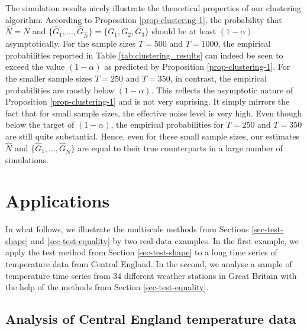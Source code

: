 The simulation results nicely illustrate the theoretical properties of our clustering algorithm. According to Proposition \ref{prop-clustering-1}, the probability that $\widehat{N} = N$ and $\{ \widehat{G}_1,\ldots,\widehat{G}_{\widehat{N}}\} = \{G_1,G_2,G_3\}$ should be at least $(1-\alpha)$ asymptotically. For the sample sizes $T = 500$ and $T = 1000$, the empirical probabilities reported in Table \ref{tab:clustering_results} can indeed be seen to exceed the value $(1-\alpha)$ as predicted by Proposition \ref{prop-clustering-1}. For the smaller sample sizes $T=250$ and $T=350$, in contrast, the empirical probabilities are mostly below $(1-\alpha)$. This reflects the asymptotic nature of Proposition \ref{prop-clustering-1} and is not very suprising. It simply mirrors the fact that for small sample sizes, the effective noise level is very high. Even though below the target of $(1-\alpha)$, the empirical probabilities for $T=250$ and $T=350$ are still quite substantial. Hence, even for these small sample sizes, our estimates $\widehat{N}$ and $\{ \widehat{G}_1,\ldots,\widehat{G}_{\widehat{N}} \}$ are equal to their true counterparts in a large number of simulations. 



\section{Applications}\label{sec-data}


In what follows, we illustrate the multiscale methods from Sections \ref{sec-test-shape} and \ref{sec-test-equality} by two real-data examples. In the first example, we apply the test method from Section \ref{sec-test-shape} to a long time series of temperature data from Central England. In the second, we analyse a sample of temperature time series from 34 different weather stations in Great Britain with the help of the methods from Section \ref{sec-test-equality}. 


\subsection{Analysis of Central England temperature data}\label{subsec-data-1} 


